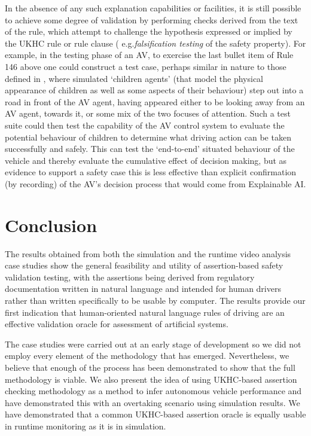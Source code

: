 In the absence of any such explanation capabilities or facilities, it is still possible to achieve some degree of validation by performing checks 
derived from the text of the rule, which attempt to challenge the hypothesis expressed or implied by the UKHC rule or rule clause (
e.g.\emph{falsification testing} of the safety property). 
%
For example, in the testing phase of an AV, to exercise the last bullet item of Rule 146 above one could construct a test case, perhaps similar in nature to those defined in \cite{EuroNCAP}, where simulated `children agents' (that model the physical appearance of children as well as some aspects of their behaviour) step out into a road in front of the AV agent, having appeared either to be looking away from an AV agent, towards it, or some mix of the two focuses of attention. 
%
Such a test suite could then test the capability of the AV control system to evaluate the potential behaviour of children to determine what driving action can be taken successfully and safely. 
%
This can test the `end-to-end' situated behaviour of the vehicle and thereby evaluate the cumulative effect of decision making, but as evidence to support a safety case this is less effective than explicit confirmation (by recording) of the AV's decision process that would come from Explainable AI.

\section{Conclusion}\label{conclusion}
The results obtained from both the simulation and the runtime video analysis case studies show the general feasibility and utility of assertion-based safety validation testing, with the assertions being derived from regulatory documentation written in natural language and intended for human drivers rather than written specifically to be usable by computer. The results provide our first indication that human-oriented natural language rules of driving are an effective validation oracle for assessment of artificial systems.

The case studies were carried out at an early stage of development so we did not employ every element of the methodology that has emerged. Nevertheless, we believe that enough of the process has been demonstrated to show that the full methodology is viable. 
%
We also present the idea of using UKHC-based assertion checking methodology as a method to infer autonomous vehicle performance and have demonstrated this with an overtaking scenario using simulation results. 
%
We have demonstrated that a common UKHC-based assertion oracle is equally usable in runtime monitoring as it is in simulation.


